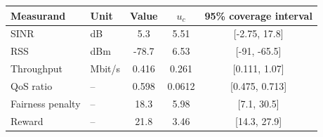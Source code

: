 \begin{tabular}{llccc}
\hline
\textbf{Measurand} & \textbf{Unit} & \textbf{Value} & \textbf{$u_c$} & \textbf{95\% coverage interval} \\
\hline
SINR & dB & 5.3 & 5.51 & [-2.75, 17.8] \\
RSS & dBm & -78.7 & 6.53 & [-91, -65.5] \\
Throughput & Mbit/s & 0.416 & 0.261 & [0.111, 1.07] \\
QoS ratio & -- & 0.598 & 0.0612 & [0.475, 0.713] \\
Fairness penalty & -- & 18.3 & 5.98 & [7.1, 30.5] \\
Reward & -- & 21.8 & 3.46 & [14.3, 27.9] \\
\hline
\end{tabular}